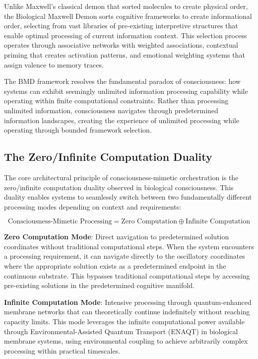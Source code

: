 \documentclass[12pt,a4paper]{article}
\begin{document}
Unlike Maxwell's classical demon that sorted molecules to create physical order, the Biological Maxwell Demon sorts cognitive frameworks to create informational order, selecting from vast libraries of pre-existing interpretive structures that enable optimal processing of current information context. This selection process operates through associative networks with weighted associations, contextual priming that creates activation patterns, and emotional weighting systems that assign valence to memory traces.

The BMD framework resolves the fundamental paradox of consciousness: how systems can exhibit seemingly unlimited information processing capability while operating within finite computational constraints. Rather than processing unlimited information, consciousness navigates through predetermined information landscapes, creating the experience of unlimited processing while operating through bounded framework selection.

\subsection{The Zero/Infinite Computation Duality}

The core architectural principle of consciousness-mimetic orchestration is the zero/infinite computation duality observed in biological consciousness. This duality enables systems to seamlessly switch between two fundamentally different processing modes depending on context and requirements:

$$\text{Consciousness-Mimetic Processing} = \text{Zero Computation} \oplus \text{Infinite Computation}$$

\textbf{Zero Computation Mode}: Direct navigation to predetermined solution coordinates without traditional computational steps. When the system encounters a processing requirement, it can navigate directly to the oscillatory coordinates where the appropriate solution exists as a predetermined endpoint in the continuous substrate. This bypasses traditional computational steps by accessing pre-existing solutions in the predetermined cognitive manifold.

\textbf{Infinite Computation Mode}: Intensive processing through quantum-enhanced membrane networks that can theoretically continue indefinitely without reaching capacity limits. This mode leverages the infinite computational power available through Environmental-Assisted Quantum Transport (ENAQT) in biological membrane systems, using environmental coupling to achieve arbitrarily complex processing within practical timescales.
\end{document}
